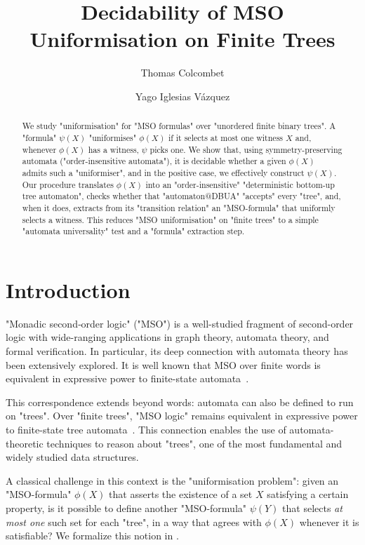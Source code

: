 \documentclass[a4paper,UKenglish,cleveref, autoref, thm-restate]{lipics-v2021}
\title{Decidability of MSO Uniformisation on Finite Trees}
\author{Thomas Colcombet}
	{CNRS, IRIF, Universit\'e Paris Diderot, France}
	{thomas.colcombet@irif.fr}
	{https://orcid.org/0000-0001-6529-6963}
	{}
\author{Yago Iglesias Vázquez}{Universit\'e Paris Diderot, France}{me@yagoiglesias.fr}{}{}
\begin{document}
\maketitle

\begin{abstract}
	We study "uniformisation" for "MSO formulas" over "unordered finite binary trees". A "formula" $\psi(X)$ "uniformises" $\phi(X)$
	if it selects at most one witness $X$ and, whenever $\phi(X)$ has a witness, $\psi$ picks one. We show that,
	using symmetry-preserving automata ("order-insensitive automata"), it is decidable whether a
	given $\phi(X)$ admits such a "uniformiser", and in the positive case, we effectively construct $\psi(X)$. Our procedure translates $\phi(X)$ into
	an "order-insensitive" "deterministic bottom-up tree automaton", checks whether that "automaton@DBUA" "accepts" every "tree", and, when
	it does, extracts from its "transition relation" an "MSO-formula" that uniformly selects a witness. This reduces "MSO uniformisation"
	on "finite trees" to a simple "automata universality" test and a "formula" extraction step.
\end{abstract}
\tableofcontents
\newpage
{}
\section{Introduction}

"Monadic second‐order logic" ("MSO") is a well-studied fragment of second-order logic with wide-ranging applications in graph theory, automata theory, and formal verification.
In particular, its deep connection with automata theory has been extensively explored. It is well known that MSO over finite words is equivalent in expressive power to
finite-state automata~\cite{Buchi60}.

This correspondence extends beyond words: automata can also be defined to run on "trees". Over "finite trees", "MSO logic" remains equivalent in expressive power to finite-state
tree automata~\cite{TW68, Don70}. This connection enables the use of automata-theoretic techniques to reason about "trees", one of the most fundamental and widely studied data
structures.

A classical challenge in this context is the "uniformisation problem": given an "MSO-formula" $\phi(X)$ that asserts the existence of a set $X$ satisfying a certain property,
is it possible to define another "MSO-formula" $\psi(Y)$ that selects \emph{at most one} such set for each "tree", in a way that agrees with $\phi(X)$ whenever it is satisfiable? We
formalize this notion in .
\end{document}
